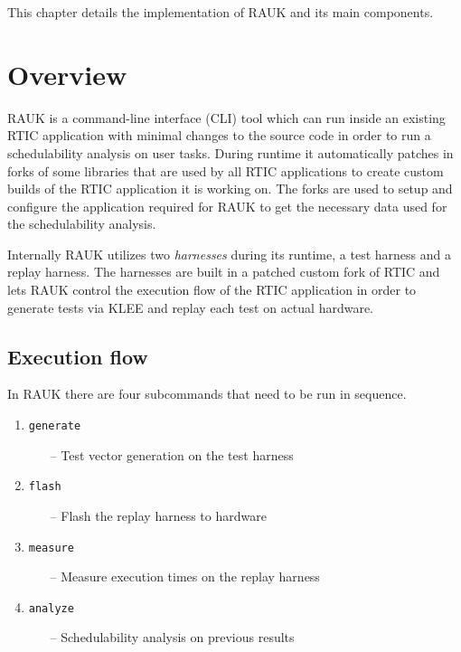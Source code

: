 This chapter details the implementation of RAUK and its main components.

\section{Overview}
RAUK is a command-line interface (CLI) tool which can run inside an existing
RTIC application with minimal changes to the source code in order to run a
schedulability analysis on user tasks. During runtime it automatically patches
in forks of some libraries that are used by all RTIC applications to create
custom builds of the RTIC application it is working on. The forks are used to
setup and configure the application required for RAUK to get the necessary data
used for the schedulability analysis.

Internally RAUK utilizes two \emph{harnesses} during its runtime, a test
harness and a replay harness. The harnesses are built in a patched custom fork
of RTIC and lets RAUK control the execution flow of the RTIC application in
order to generate tests via KLEE and replay each test on actual hardware.

\subsection{Execution flow}
In RAUK there are four subcommands that need to be run in sequence.

\begin{enumerate}
    \item \texttt{generate}
    \begin{itemize}
        \item [--] Test vector generation on the test harness
    \end{itemize}
    \item \texttt{flash}
    \begin{itemize}
        \item [--] Flash the replay harness to hardware
    \end{itemize}
    \item \texttt{measure}
    \begin{itemize}
        \item [--] Measure execution times on the replay harness
    \end{itemize}
    \item \texttt{analyze}
    \begin{itemize}
        \item [--] Schedulability analysis on previous results
    \end{itemize}
\end{enumerate}

